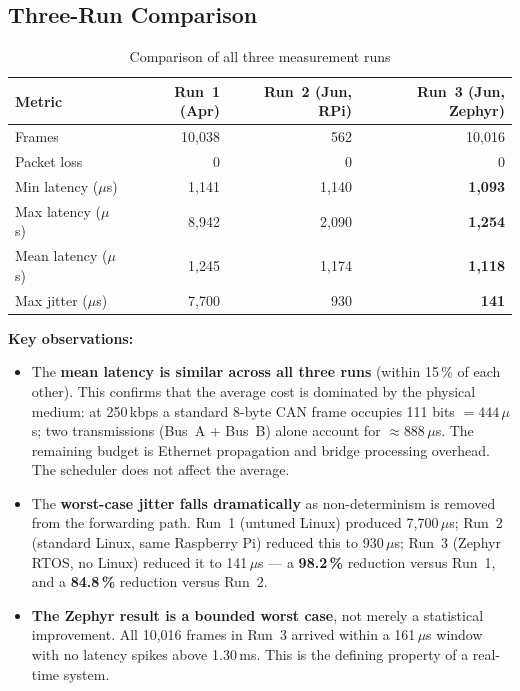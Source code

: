 \documentclass[11pt,a4paper]{article}
\begin{document}
\subsection{Three-Run Comparison}

\begin{table}[H]
    \centering
    \caption{Comparison of all three measurement runs}
    \label{tab:comparison}
    \begin{tabular}{lrrr}
        \toprule
        \textbf{Metric}
            & \textbf{Run~1} (Apr)
            & \textbf{Run~2} (Jun, RPi)
            & \textbf{Run~3} (Jun, Zephyr) \\
        \midrule
        Frames           & 10{,}038 & 562     & 10{,}016 \\
        Packet loss      & 0        & 0       & 0 \\
        \midrule
        Min latency ($\mu$s) & 1{,}141 & 1{,}140 & \textbf{1{,}093} \\
        Max latency ($\mu$s) & 8{,}942 & 2{,}090 & \textbf{1{,}254} \\
        Mean latency ($\mu$s)& 1{,}245 & 1{,}174 & \textbf{1{,}118} \\
        \midrule
        Max jitter ($\mu$s)  & 7{,}700 & 930 & \textbf{141} \\
        \bottomrule
    \end{tabular}
\end{table}

\textbf{Key observations:}
\begin{itemize}
    \item The \textbf{mean latency is similar across all three runs} (within 15\,\% of
          each other).  This confirms that the average cost is dominated by the physical
          medium: at 250\,kbps a standard 8-byte CAN frame occupies 111 bits
          $= 444\,\mu$s; two transmissions (Bus~A + Bus~B) alone account for
          $\approx 888\,\mu$s.  The remaining budget is Ethernet propagation and bridge
          processing overhead.  The scheduler does not affect the average.

    \item The \textbf{worst-case jitter falls dramatically} as non-determinism is
          removed from the forwarding path.  Run~1 (untuned Linux) produced 7{,}700\,$\mu$s;
          Run~2 (standard Linux, same Raspberry Pi) reduced this to 930\,$\mu$s; Run~3
          (Zephyr RTOS, no Linux) reduced it to 141\,$\mu$s --- a \textbf{98.2\,\%}
          reduction versus Run~1, and a \textbf{84.8\,\%} reduction versus Run~2.

    \item \textbf{The Zephyr result is a bounded worst case}, not merely a statistical
          improvement.  All 10{,}016 frames in Run~3 arrived within a 161\,$\mu$s window
          with no latency spikes above 1.30\,ms.  This is the defining property of a
          real-time system.
\end{itemize}
\end{document}
